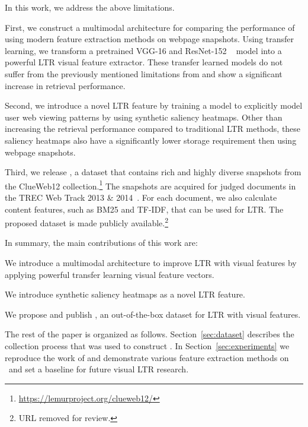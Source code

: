 In this work, we address the above limitations.

First, we construct a multimodal architecture for comparing the performance of using modern feature extraction methods on webpage snapshots. Using transfer learning, we transform a pretrained VGG-16 and ResNet-152 ~\cite{simonyan2014very, he2016deep} model into a powerful \ac{LTR} visual feature extractor. These transfer learned models do not suffer from the previously mentioned limitations from \cite{fan2017learning} and show a significant increase in retrieval performance.

Second, we introduce a novel \ac{LTR} feature by training a model to explicitly model user web viewing patterns by using synthetic saliency heatmaps. Other than increasing the retrieval performance compared to traditional \ac{LTR} methods, these saliency heatmaps also have a significantly lower storage requirement then using webpage snapshots.

Third, we release \datasetname, a dataset that contains rich and highly diverse snapshots from the ClueWeb12 collection.\footnote{\url{https://lemurproject.org/clueweb12/}} The snapshots are acquired for judged documents in the TREC Web Track 2013 \& 2014~\cite{collins2013trec,collins2015trec}. For each document, we also calculate content features, such as BM25 and TF-IDF, that can be used for \ac{LTR}.
The proposed dataset is made publicly available.\footnote{URL removed for review.}
%


In summary, the main contributions of this work are:
\begin{inparaenum}[(i)]
\item We introduce a multimodal architecture to improve \ac{LTR} with visual features by applying powerful transfer learning visual feature vectors.
\item We introduce synthetic saliency heatmaps as a novel \ac{LTR} feature. 
\item We propose and publish \datasetname, an out-of-the-box dataset for \ac{LTR} with visual features.
\end{inparaenum}

 The rest of the paper is organized as follows. Section~\ref{sec:dataset} describes the collection process that was used to construct \datasetname. In Section~\ref{sec:experiments} we reproduce the work of \citet{fan2017learning} and demonstrate various feature extraction methods on \datasetname~and set a baseline for future visual \ac{LTR} research.  
\fi